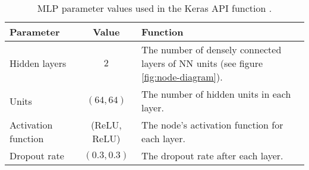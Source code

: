 \begin{table}[!htb]
    \centering
    \caption{\ac{MLP} parameter values used in the Keras API function \cite{chollet2015keras}.}
    \begin{tabular}{>{\raggedright}p{} | c | p{}}
        \textbf{Parameter}              & \textbf{Value}            & \textbf{Function} \\ \hline
        Hidden layers                   & $2$                       & The number of densely connected layers of \ac{NN} units (see figure \ref{fig:node-diagram}). \\ \hline
        Units                           & $(64, 64)$     & The number of hidden units in each layer. \\ \hline
        Activation function             & (ReLU, ReLU)              & The node's activation function for each layer.\\ \hline
        Dropout rate                    & $(0.3, 0.3)$   & The dropout rate after each layer. \\ \hline
    \end{tabular}
    \label{tab:mlp-parameters}
\end{table}